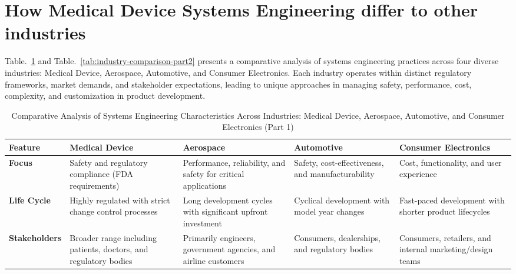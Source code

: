 \documentclass[conference]{IEEEtran}
\begin{document}
\section{How Medical Device Systems Engineering differ to other industries}

Table.~\ref{tab:industry-comparison-part1} and Table.~\ref{tab:industry-comparison-part2} presents a comparative analysis of systems engineering practices 
across four diverse industries: Medical Device, Aerospace, Automotive, 
and Consumer Electronics. Each industry operates within distinct 
regulatory frameworks, market demands, and stakeholder expectations, 
leading to unique approaches in managing safety, performance, cost, 
complexity, and customization in product development.

    \begin{table}[t]
        \caption{Comparative Analysis of Systems Engineering Characteristics Across Industries: Medical Device, Aerospace, Automotive, and Consumer Electronics (Part 1)}
        \label{tab:industry-comparison-part1}
        \centering
        \begin{tabular}{|p{2.5cm}|p{3.5cm}|p{3.5cm}|p{3.5cm}|p{3.5cm}|}
        \hline
        \textbf{Feature} & \textbf{Medical Device} & \textbf{Aerospace} & \textbf{Automotive} & \textbf{Consumer Electronics} \\ \hline
        \textbf{Focus} & Safety and regulatory compliance (FDA requirements) & Performance, reliability, and safety for critical applications & Safety, cost-effectiveness, and manufacturability & Cost, functionality, and user experience \\ \hline
        \textbf{Life Cycle} & Highly regulated with strict change control processes & Long development cycles with significant upfront investment & Cyclical development with model year changes & Fast-paced development with shorter product lifecycles \\ \hline
        \textbf{Stakeholders} & Broader range including patients, doctors, and regulatory bodies & Primarily engineers, government agencies, and airline customers & Consumers, dealerships, and regulatory bodies & Consumers, retailers, and internal marketing/design teams \\ \hline
        \end{tabular}
    \end{table}
    
\end{document}
